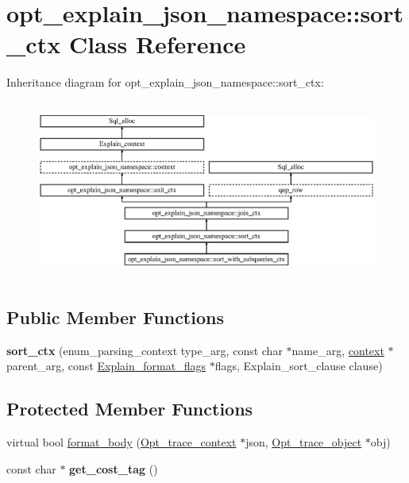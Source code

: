 \hypertarget{classopt__explain__json__namespace_1_1sort__ctx}{}\section{opt\+\_\+explain\+\_\+json\+\_\+namespace\+:\+:sort\+\_\+ctx Class Reference}
\label{classopt__explain__json__namespace_1_1sort__ctx}
Inheritance diagram for opt\+\_\+explain\+\_\+json\+\_\+namespace\+:\+:sort\+\_\+ctx\+:\begin{figure}[H]
\begin{center}
\leavevmode
\includegraphics[height=5.903615cm]{classopt__explain__json__namespace_1_1sort__ctx}
\end{center}
\end{figure}
\subsection*{Public Member Functions}
\begin{DoxyCompactItemize}
\item 
\mbox{\label{classopt__explain__json__namespace_1_1sort__ctx_a8f52ead0dc651f22f42dc38ebbb761c5}} 
{\bfseries sort\+\_\+ctx} (enum\+\_\+parsing\+\_\+context type\+\_\+arg, const char $\ast$name\+\_\+arg, \mbox{\hyperlink{classopt__explain__json__namespace_1_1context}{context}} $\ast$parent\+\_\+arg, const \mbox{\hyperlink{classExplain__format__flags}{Explain\+\_\+format\+\_\+flags}} $\ast$flags, Explain\+\_\+sort\+\_\+clause clause)
\end{DoxyCompactItemize}
\subsection*{Protected Member Functions}
\begin{DoxyCompactItemize}
\item 
virtual bool \mbox{\hyperlink{classopt__explain__json__namespace_1_1sort__ctx_a49cc7069f8d31545de8a62dfa53cae41}{format\+\_\+body}} (\mbox{\hyperlink{classOpt__trace__context}{Opt\+\_\+trace\+\_\+context}} $\ast$json, \mbox{\hyperlink{classOpt__trace__object}{Opt\+\_\+trace\+\_\+object}} $\ast$obj)
\item 
\mbox{\label{classopt__explain__json__namespace_1_1sort__ctx_ac6af05b139fc8355bf854e220ce5f300}} 
const char $\ast$ {\bfseries get\+\_\+cost\+\_\+tag} ()
\end{DoxyCompactItemize}
